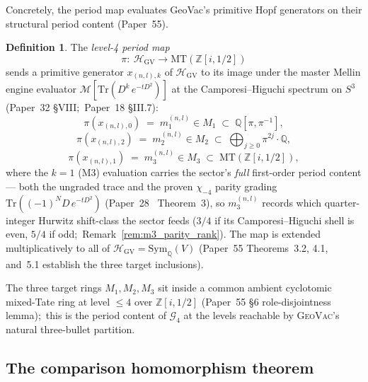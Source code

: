 \documentclass[11pt,a4paper]{article}
\theoremstyle{plain}
\theoremstyle{definition}
\newtheorem{definition}[theorem]{Definition}
\newcommand{\HGV}{\mathcal{H}_{\mathrm{GV}}}
\newcommand{\Sym}{\mathrm{Sym}}
\newcommand{\MT}{\mathrm{MT}}
\newcommand{\Q}{\mathbb{Q}}
\newcommand{\Z}{\mathbb{Z}}
\begin{document}
Concretely, the period map evaluates GeoVac's primitive Hopf
generators on their structural period content (Paper~55).

\begin{definition}\label{def:period_map}
The \emph{level-4 period map}
\[
   \pi:\ \HGV \longrightarrow \MT(\Z[i, 1/2])
\]
sends a primitive generator $x_{(n, l), k}$ of $\HGV$ to its image
under the master Mellin engine evaluator
$\mathcal{M}[\mathrm{Tr}(D^{k}\, e^{-tD^{2}})]$ at the
Camporesi--Higuchi spectrum on $S^{3}$ (Paper~32 \S VIII;\ Paper~18
\S III.7):
\[
   \pi(x_{(n, l), 0}) \;=\; m_{1}^{(n, l)} \in M_{1} \;\subset\; \Q[\pi, \pi^{-1}],
\]
\[
   \pi(x_{(n, l), 2}) \;=\; m_{2}^{(n, l)} \in M_{2} \;\subset\; \bigoplus_{j \ge 0} \pi^{2j} \cdot \Q,
\]
\[
   \pi(x_{(n, l), 1}) \;=\; m_{3}^{(n, l)} \in M_{3} \;\subset\; \MT(\Z[i, 1/2]),
\]
where the $k = 1$ (M3) evaluation carries the sector's \emph{full}
first-order period content --- both the ungraded trace and the proven
$\chi_{-4}$ parity grading $\mathrm{Tr}((-1)^{N} D\,e^{-tD^{2}})$
(Paper~28~\cite{loutey_paper28} Theorem~3), so $m_{3}^{(n, l)}$ records
which quarter-integer Hurwitz shift-class the sector feeds ($3/4$ if its
Camporesi--Higuchi shell is even, $5/4$ if odd;\
Remark~\ref{rem:m3_parity_rank}). The map is extended
multiplicatively to all of $\HGV = \Sym_{\Q}(V)$ (Paper~55
Theorems~3.2, 4.1, and~5.1 establish the three target inclusions).
\end{definition}

The three target rings $M_{1}, M_{2}, M_{3}$ sit inside a common
ambient cyclotomic mixed-Tate ring at level $\le 4$ over
$\Z[i, 1/2]$ (Paper~55 \S 6 role-disjointness lemma);\ this is the
period content of $\mathcal{G}_{4}$ at the levels reachable by
\textsc{GeoVac}'s natural three-bullet partition.

\subsection{The comparison homomorphism theorem}\label{sec:injection_theorem}
\end{document}
